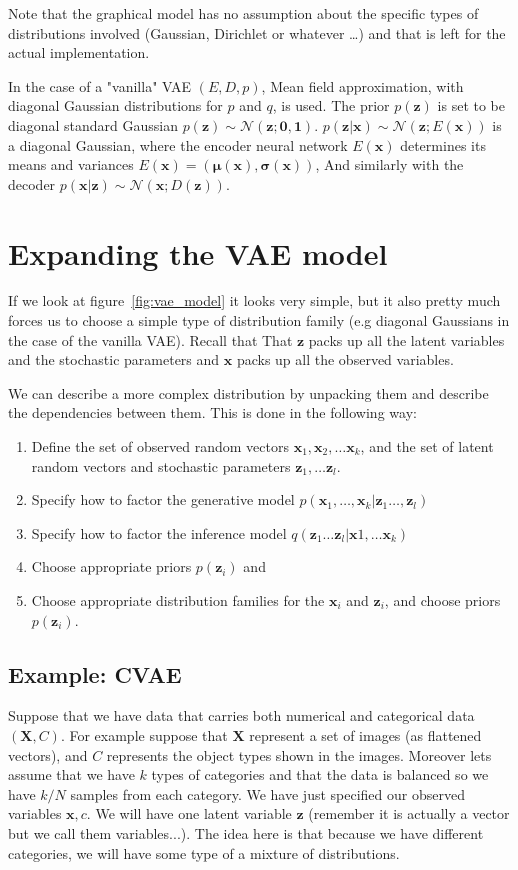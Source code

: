 \documentclass[11pt, a4paper]{report}
\theoremstyle{plain}
\theoremstyle{definition}
\newtheorem{mydef}{Definition}[chapter]
\theoremstyle{remark}
\newcommand{\X}{\mathbf{X}}
\newcommand{\x}{\mathbf{x}}
\newcommand{\z}{\mathbf{z}}
\newcommand{\NN}{\mathcal{N}}
\newcommand{\bv}[1]{\boldsymbol{#1}}
\begin{document}
Note that the graphical model has no assumption about the specific types of
distributions involved (Gaussian, Dirichlet or whatever \dots) and that is left
for the actual implementation.

In the case of a "vanilla" VAE $(E,D,p)$, 
Mean field approximation, with diagonal Gaussian distributions for $p$ and $q$,
is used.
The prior $p(\z)$ is set to be diagonal standard Gaussian
$p(\z) \sim \NN(\z ; \bv{0},\bv{1})$.
$p(\z | \x) \sim \NN(\z ;E(\x))$ is a diagonal Gaussian, where the encoder
neural network $E(\x)$ 
determines its means and variances $E(\x) = (\bv{\mu}(\x), \bv{\sigma}(\x))$, 
And similarly with the decoder $p(\x | \z) \sim \NN(\x ;D(\z))$.



\section{Expanding the VAE model}
If we look at figure~\ref{fig:vae_model} it looks very simple, but it also
pretty much forces us to choose a simple type of distribution family (e.g
diagonal Gaussians in the case of the vanilla VAE).
Recall that That $\z$ packs up all the latent variables and the stochastic
parameters and $\x$ packs up all the observed variables.

We can describe a more complex distribution by unpacking them and describe the
dependencies between them.
This is done in the following way:
\label{VAE-specs}
\begin{enumerate}
\item{} Define the set of observed random vectors $\x_1, \x_2, \dots \x_k$, and 
the set of latent random vectors and stochastic parameters $\z_1, \dots \z_l$.
\item{} Specify how to factor the generative model $p(\x_1,\dots, \x_k| \z_1
\dots , \z_l)$
\item{} Specify how to factor the inference model $q(\z_1 \dots \z_l | \x1,
\dots \x_k)$
\item{} Choose appropriate priors $p(\z_i)$ and
\item{} Choose appropriate distribution families for the $\x_i$ and $\z_i$,
and choose priors $p(\z_i)$.
\end{enumerate}

\subsection{Example: CVAE}
Suppose that we have data that carries both numerical and categorical data $(\X,
C)$.
For example suppose that $\X$ represent a set of images (as flattened vectors),
and $C$ represents the object types shown in the images.
Moreover lets assume that we have $k$ types of categories and that the data is
balanced so we have $k/N$ samples from each category.
We have just specified our observed variables $\x, c$.
We will have one latent variable $\z$ (remember it is actually a vector but we
call them variables...).
The idea here is that because we have different categories, we will have some
type of a mixture of distributions.
\end{document}
